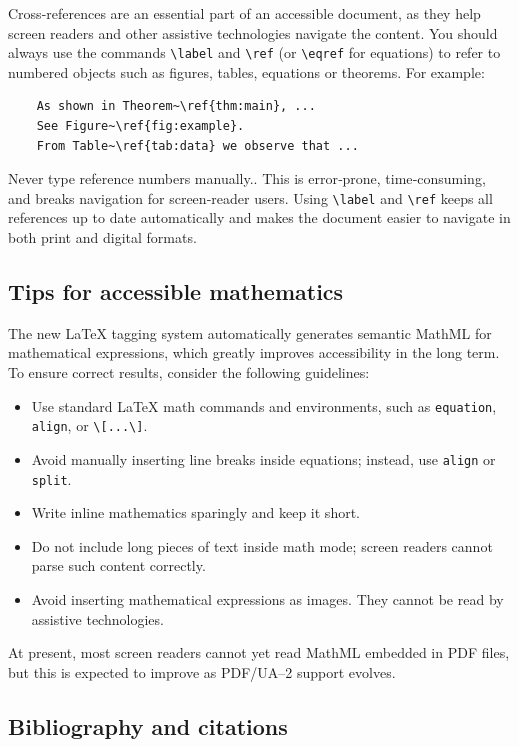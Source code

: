 Cross-references are an essential part of an accessible document, as they help
screen readers and other assistive technologies navigate the content.  
You should always use the commands \verb|\label| and \verb|\ref| (or
\verb|\eqref| for equations) to refer to numbered objects such as figures,
tables, equations or theorems.  For example:

\begin{verbatim}
	As shown in Theorem~\ref{thm:main}, ...
	See Figure~\ref{fig:example}.
	From Table~\ref{tab:data} we observe that ...
\end{verbatim}

Never type reference numbers manually.. This is error‑prone, time‑consuming,
and breaks navigation for screen‑reader users.  
Using \verb|\label| and \verb|\ref| keeps all references up to date
automatically and makes the document easier to navigate in both print and
digital formats.

\subsection{Tips for accessible mathematics}

The new LaTeX tagging system automatically generates semantic MathML for
mathematical expressions, which greatly improves accessibility in the long
term.  To ensure correct results, consider the following guidelines:

\begin{itemize}
	\item Use standard \LaTeX{} math commands and environments, such as
	\verb|equation|, \verb|align|, or \verb|\[...\]|.
	\item Avoid manually inserting line breaks inside equations; instead, use
	\verb|align| or \verb|split|.
	\item Write inline mathematics sparingly and keep it short.
	\item Do not include long pieces of text inside math mode; screen readers
	cannot parse such content correctly.
	\item Avoid inserting mathematical expressions as images.  They cannot be
	read by assistive technologies.
\end{itemize}

At present, most screen readers cannot yet read MathML embedded in PDF files,
but this is expected to improve as PDF/UA--2 support evolves.

\subsection{Bibliography and citations}

